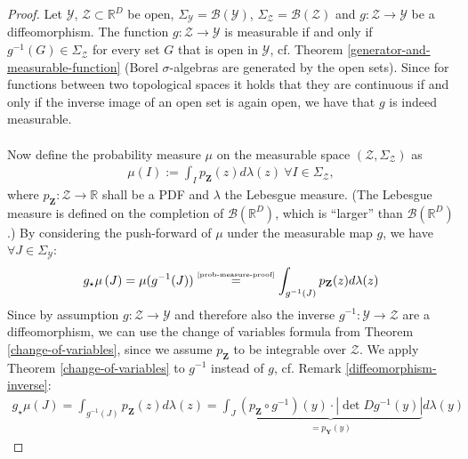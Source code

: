 \documentclass[12pt, a4paper]{article}
\numberwithin{equation}{section}
\theoremstyle{definition}
\theoremstyle{definition}
\begin{document}
	\begin{proof}
		Let $\mathcal Y$, $\mathcal Z\subset\mathbb{R}^D$ be open,  $\Sigma_{\mathcal Y} = \mathcal B(\mathcal Y)$, $\Sigma_{\mathcal Z} = \mathcal B(\mathcal Z)$ and $g: \mathcal Z\rightarrow\mathcal Y$ be a diffeomorphism. The function $g: \mathcal Z \rightarrow \mathcal Y$ is measurable if and only if $g^{-1}(G)\in \Sigma_{\mathcal Z}$ for every set $G$ that is open in $\mathcal Y$, cf. Theorem \ref{generator-and-measurable-function} (Borel $\sigma$-algebras are generated by the open sets). Since for functions between two topological spaces it holds that they are continuous if and only if the inverse image of an open set is again open, we have that $g$ is indeed measurable. 
		\\ \\ Now define the probability measure $\mu$ on the measurable space $(\mathcal Z, \Sigma_{\mathcal Z})$ as 
		\begin{align}\label{prob-measure-proof}
			\mu(I) := \int_{I} p_{\mathbf{Z}}(z)d\lambda(z) \ \forall I\in \Sigma_{\mathcal Z}, 
		\end{align}
		where $p_{\mathbf{Z}}: \mathcal Z \rightarrow\mathbb{R}$ shall be a PDF and $\lambda$ the Lebesgue measure. (The Lebesgue measure is defined on the completion of $\mathcal B(\mathbb R^D)$, which is \enquote{larger} than $\mathcal B(\mathbb R^D)$.) By considering the push-forward of $\mu$ under the measurable map $g$, we have $\forall J \in \Sigma_{\mathcal Y}$: 
		\begin{align}
			g_{\star}\mu\left(J\right) = \mu(g^{-1}(J))  \overset{\tiny\eqref{prob-measure-proof}}{=} \int_{g^{-1}(J)} p_{\mathbf{Z}}(z)d\lambda(z)
		\end{align}
		Since by assumption $g:\mathcal Z\rightarrow \mathcal Y$ and therefore also the inverse $g^{-1}: \mathcal Y \rightarrow \mathcal Z$ are a diffeomorphism, we can use the change of variables formula from Theorem \ref{change-of-variables}, since we assume $p_{\mathbf{Z}}$ to be integrable over $\mathcal Z$. We apply Theorem \ref{change-of-variables} to $g^{-1}$ instead of $g$, cf. Remark \ref{diffeomorphism-inverse}: 
		\begin{align}
			g_{\star}\mu(J) = \int_{g^{-1}(J)}p_{\mathbf{Z}}(z)d\lambda(z) = \int_{J} \underbrace{\left(p_{\mathbf{Z}}\circ g^{-1}\right)(y) \cdot \left\vert \det Dg^{-1}(y) \right\vert }_{= p_{\mathbf{Y}}(y)} d\lambda(y) 						
		\end{align}
	\end{proof}
	
\end{document}
